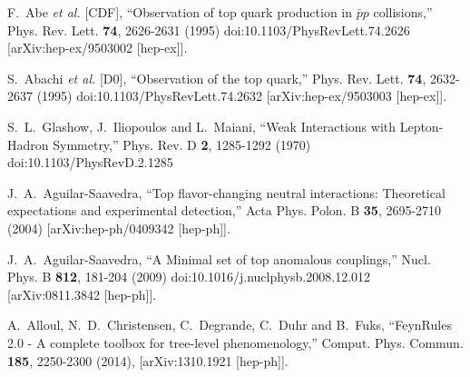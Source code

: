 \documentclass[11pt,onecolumn,english,showpacs,preprintnumbers,amsmath,amssymb,floatfix,nofootinbib]{revtex4-1}
\begin{document}
\begin{thebibliography}{}
	


F.~Abe \textit{et al.} [CDF],
``Observation of top quark production in $\bar{p}p$ collisions,''
Phys. Rev. Lett. \textbf{74}, 2626-2631 (1995)
doi:10.1103/PhysRevLett.74.2626
[arXiv:hep-ex/9503002 [hep-ex]].




S.~Abachi \textit{et al.} [D0],
``Observation of the top quark,''
Phys. Rev. Lett. \textbf{74}, 2632-2637 (1995)
doi:10.1103/PhysRevLett.74.2632
[arXiv:hep-ex/9503003 [hep-ex]].





S.~L.~Glashow, J.~Iliopoulos and L.~Maiani,
``Weak Interactions with Lepton-Hadron Symmetry,''
Phys. Rev. D \textbf{2}, 1285-1292 (1970)
doi:10.1103/PhysRevD.2.1285
	



J.~A.~Aguilar-Saavedra,
``Top flavor-changing neutral interactions: Theoretical expectations and experimental detection,''
Acta Phys. Polon. B \textbf{35}, 2695-2710 (2004)
[arXiv:hep-ph/0409342 [hep-ph]].




J.~A.~Aguilar-Saavedra,
``A Minimal set of top anomalous couplings,''
Nucl. Phys. B \textbf{812}, 181-204 (2009)
doi:10.1016/j.nuclphysb.2008.12.012
[arXiv:0811.3842 [hep-ph]].
	






A.~Alloul, N.~D.~Christensen, C.~Degrande, C.~Duhr and B.~Fuks,
``FeynRules  2.0 - A complete toolbox for tree-level phenomenology,''
Comput. Phys. Commun. \textbf{185}, 2250-2300 (2014),
[arXiv:1310.1921 [hep-ph]].





\end{thebibliography}
\end{document}
